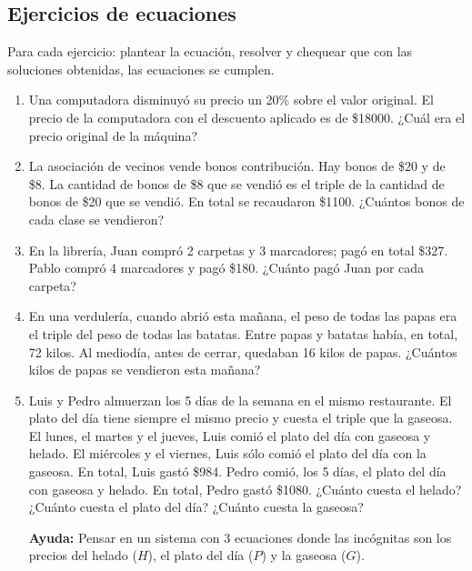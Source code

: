 \documentclass{article}
\begin{document}
\newpage
\subsection{Ejercicios de ecuaciones}
\begin{normalsize}
Para cada ejercicio: plantear la ecuación, resolver y chequear que con las soluciones obtenidas, las ecuaciones se cumplen.
\end{normalsize}
\begin{enumerate}
	\item Una computadora disminuyó su precio un 20\% sobre el valor original. El precio de la computadora con el descuento aplicado es de \$18000. ¿Cuál era el precio original de la máquina?
	\item La asociación de vecinos vende bonos contribución. Hay bonos de \$20 y de \$8. La cantidad de bonos de \$8 que se vendió es el triple de la cantidad de bonos de \$20 que se vendió. En total se recaudaron \$1100. ¿Cuántos bonos de cada clase se vendieron? 
	\item En la librería, Juan compró 2 carpetas y 3 marcadores; pagó en total \$327. Pablo compró 4 marcadores y pagó \$180. ¿Cuánto pagó Juan por cada carpeta?
	\item En una verdulería, cuando abrió esta mañana, el peso de todas las papas era el triple del peso de todas las batatas. Entre papas y batatas había, en total, 72 kilos. Al mediodía, antes de cerrar, quedaban 16 kilos de papas. ¿Cuántos kilos de papas se vendieron esta mañana?
	\item Luis y Pedro almuerzan los 5 días de la semana en el mismo restaurante. El plato del día tiene siempre el mismo precio y cuesta el triple que la gaseosa. El lunes, el martes y el jueves, Luis comió el plato del día con gaseosa y helado. El miércoles y el viernes, Luis sólo comió el plato del día con la gaseosa. En total, Luis gastó \$984. Pedro comió, los 5 días, el plato del día con gaseosa y helado. En total, Pedro gastó \$1080. ¿Cuánto cuesta el helado? ¿Cuánto cuesta el plato del día? ¿Cuánto cuesta la gaseosa?\\ \begin{small}\textbf{Ayuda:} Pensar en un sistema con 3 ecuaciones donde las incógnitas son los precios del helado ($H$), el plato del día ($P$) y la gaseosa ($G$).\end{small}
\end{enumerate}

\newpage
\end{document}

